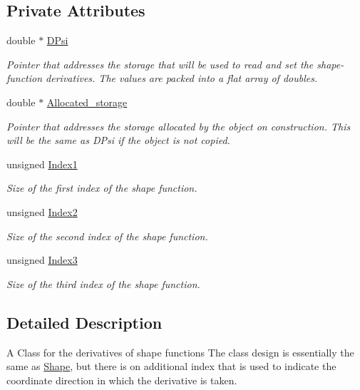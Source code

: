 \subsection*{Private Attributes}
\begin{DoxyCompactItemize}
\item 
double $\ast$ \hyperlink{classoomph_1_1DShape_aedb450cd0b8aefc4ee216517c03e7f92}{D\+Psi}
\begin{DoxyCompactList}\small\item\em Pointer that addresses the storage that will be used to read and set the shape-\/function derivatives. The values are packed into a flat array of doubles. \end{DoxyCompactList}\item 
double $\ast$ \hyperlink{classoomph_1_1DShape_a7b5d34f932015974cdf764f44e04fafb}{Allocated\+\_\+storage}
\begin{DoxyCompactList}\small\item\em Pointer that addresses the storage allocated by the object on construction. This will be the same as D\+Psi if the object is not copied. \end{DoxyCompactList}\item 
unsigned \hyperlink{classoomph_1_1DShape_a8fe23f1bb30846c65bc7ee4f79e387c8}{Index1}
\begin{DoxyCompactList}\small\item\em Size of the first index of the shape function. \end{DoxyCompactList}\item 
unsigned \hyperlink{classoomph_1_1DShape_a4028a6e759b9f1905edf884aabaa2c6d}{Index2}
\begin{DoxyCompactList}\small\item\em Size of the second index of the shape function. \end{DoxyCompactList}\item 
unsigned \hyperlink{classoomph_1_1DShape_a9745c10dc781a90f38333b0862c86f3f}{Index3}
\begin{DoxyCompactList}\small\item\em Size of the third index of the shape function. \end{DoxyCompactList}\end{DoxyCompactItemize}


\subsection{Detailed Description}
A Class for the derivatives of shape functions The class design is essentially the same as \hyperlink{classoomph_1_1Shape}{Shape}, but there is on additional index that is used to indicate the coordinate direction in which the derivative is taken. 

